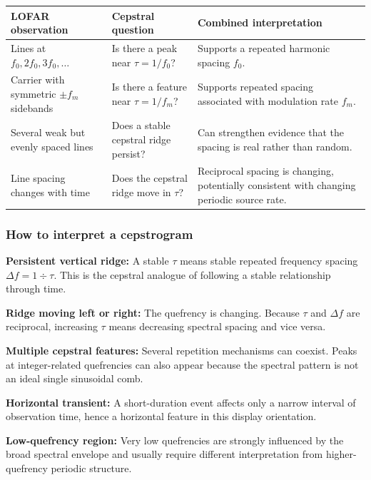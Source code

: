 \begin{tabularx}{\linewidth}{X X X}
    \toprule
    \textbf{LOFAR observation} & \textbf{Cepstral question} & Combined interpretation \\
    \midrule
    \rowcolor[gray]{0.8}Lines at $f_0, 2f_0, 3f_0, \dots$ & Is there a peak near $\tau = 1/f_0$? & Supports a repeated harmonic spacing $f_0$. \\
    Carrier with symmetric $\pm f_m$ sidebands & Is there a feature near $\tau = 1/f_m$? & Supports repeated spacing associated with modulation rate $f_m$. \\
    \rowcolor[gray]{0.8}Several weak but evenly spaced lines & Does a stable cepstral ridge persist? & Can strengthen evidence that the spacing is real rather than random.\\
    Line spacing changes with time & Does the cepstral ridge move in $\tau$? & Reciprocal spacing is changing, potentially consistent with changing periodic source rate. \\
    \bottomrule
\end{tabularx}

\subsubsection{How to interpret a cepstrogram}

\begin{compactitem}
    \item \textbf{Persistent vertical ridge: }A stable $\tau$ means stable repeated frequency spacing $\Delta f = 1 \div \tau$. This is the cepstral analogue of following a stable relationship through time.
    \item \textbf{Ridge moving left or right: }The quefrency is changing. Because $\tau$ and $\Delta f$ are reciprocal, increasing $\tau$ means decreasing spectral spacing and vice versa.
    \item \textbf{Multiple cepstral features: }Several repetition mechanisms can coexist. Peaks at integer-related quefrencies can also appear because the spectral pattern is not an ideal single sinusoidal comb.
    \item \textbf{Horizontal transient: }A short-duration event affects only a narrow interval of observation time, hence a horizontal feature in this display orientation.
    \item \textbf{Low-quefrency region: }Very low quefrencies are strongly influenced by the broad spectral envelope and usually require different interpretation from higher-quefrency periodic structure.
\end{compactitem}

